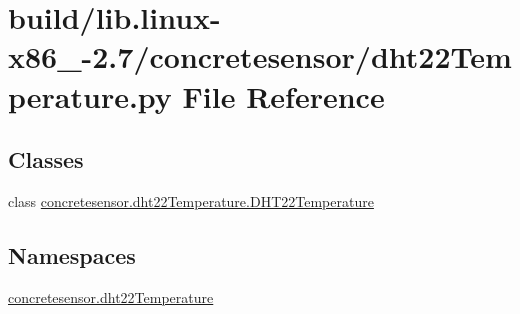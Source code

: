 \hypertarget{build_2lib_8linux-x86__64-2_87_2concretesensor_2dht22Temperature_8py}{}\section{build/lib.linux-\/x86\+\_-\/2.7/concretesensor/dht22\+Temperature.py File Reference}
\label{build_2lib_8linux-x86__64-2_87_2concretesensor_2dht22Temperature_8py}
\subsection*{Classes}
\begin{DoxyCompactItemize}
\item 
class \hyperlink{classconcretesensor_1_1dht22Temperature_1_1DHT22Temperature}{concretesensor.\+dht22\+Temperature.\+D\+H\+T22\+Temperature}
\end{DoxyCompactItemize}
\subsection*{Namespaces}
\begin{DoxyCompactItemize}
\item 
 \hyperlink{namespaceconcretesensor_1_1dht22Temperature}{concretesensor.\+dht22\+Temperature}
\end{DoxyCompactItemize}
